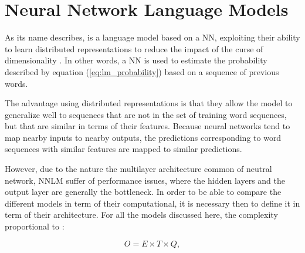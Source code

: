 


\section{Neural Network Language Models}
\label{sec:nnlms-intro}

As its name describes, is a language model based on a \ac{NN}, exploiting their
ability to learn distributed representations to reduce the impact of the
curse of dimensionality \cite{Bengio:2008}. In other words, a \ac{NN} is
used to estimate the probability described  by equation (\ref{eq:lm_probability}) based on a sequence of
previous words.

The advantage  using  distributed representations  is that they allow
the model to generalize well to sequences that are not in the set of training
word sequences, but that are similar in terms of their features. Because neural networks tend to map nearby inputs
to nearby outputs, the predictions corresponding to word sequences with
similar features are mapped to similar predictions. \cite{Bengio:2008,Bengio:2003:NPL:944919.944966}

However, due to the nature the multilayer architecture common of neutral
network, \ac{NNLM}  suffer of 
performance issues, where the hidden layers and the output layer are
generally the bottleneck. In order to be able to compare the different
models in term of their computational, it is necessary then to define it in
term of their architecture. For all the models discussed here, the  complexity proportional to \cite{DBLP:journals/corr/abs-1301-3781}:

\begin{center}
\begin{equation} O = E \times T \times Q,   \end{equation}
\end{center}

